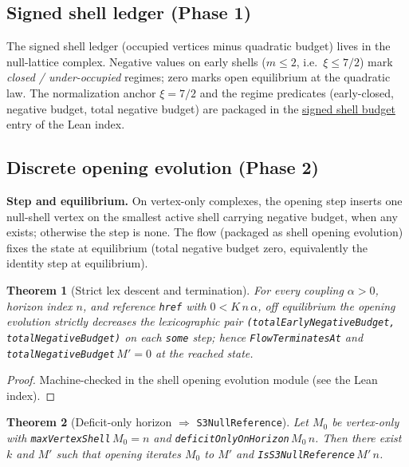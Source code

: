 \documentclass[11pt]{amsart}
\newtheorem{theorem}{Theorem}[section]
\begin{document}
\subsection{Signed shell ledger (Phase 1)}
\label{sec:signed-ledger}

The signed shell ledger (occupied vertices minus quadratic budget) lives in the
null-lattice complex. Negative values on early shells ($m\le 2$, i.e.\ $\xi\le 7/2$)
mark \emph{closed / under-occupied} regimes; zero marks open equilibrium at the quadratic
law. The normalization anchor $\xi=7/2$ and the regime predicates (early-closed,
negative budget, total negative budget) are packaged in the
\hyperref[lean:signed-shell-budget]{signed shell budget} entry of the Lean index.

\subsection{Discrete opening evolution (Phase 2)}
\label{sec:signed-opening}

\textbf{Step and equilibrium.}
On vertex-only complexes, the opening step inserts one null-shell vertex on the
smallest active shell carrying negative budget, when any exists; otherwise the step
is none. The flow (packaged as shell opening evolution) fixes the state at
equilibrium (total negative budget zero, equivalently the identity step at
equilibrium).

\begin{theorem}[Strict lex descent and termination]
\label{thm:opening-lex}
For every coupling $\alpha>0$, horizon index $n$, and reference \texttt{href} with
$0<K\,n\,\alpha$, off equilibrium the opening evolution strictly decreases the
lexicographic pair \texttt{(totalEarlyNegativeBudget, totalNegativeBudget)} on each
\texttt{some} step; hence \texttt{FlowTerminatesAt} and
\texttt{totalNegativeBudget}$\,M'=0$ at the reached state.
\end{theorem}

\begin{proof}
Machine-checked in the shell opening evolution module (see the Lean index).
\end{proof}

\begin{theorem}[Deficit-only horizon $\Rightarrow$ \texttt{S3NullReference}]
\label{thm:opening-s3}
Let $M_0$ be vertex-only with \texttt{maxVertexShell}\,$M_0=n$ and
\texttt{deficitOnlyOnHorizon}\,$M_0\,n$. Then there exist $k$ and $M'$ such that
opening iterates $M_0$ to $M'$ and \texttt{IsS3NullReference}\,$M'\,n$.
\end{theorem}
\end{document}

